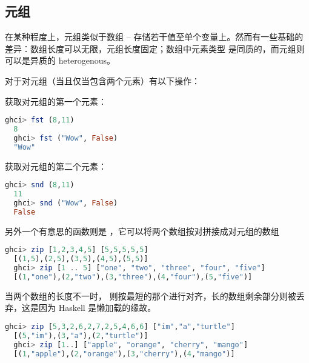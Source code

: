 \documentclass[./main.tex]{subfiles}
\begin{document}
\subsection*{元组}

在某种程度上，元组类似于数组 -- 存储若干值至单个变量上。然而有一些基础的差异：数组长度可以无限，元组长度固定；数组中元素类型
是同质的，而元组则可以是异质的 heterogenous。

对于对元组（当且仅当包含两个元素）有以下操作：

 获取对元组的第一个元素：

\begin{lstlisting}[language=Haskell]
  ghci> fst (8,11)
  8
  ghci> fst ("Wow", False)
  "Wow"
\end{lstlisting}

 获取对元组的第二个元素：

\begin{lstlisting}[language=Haskell]
  ghci> snd (8,11)
  11
  ghci> snd ("Wow", False)
  False
\end{lstlisting}

另外一个有意思的函数则是 ，它可以将两个数组按对拼接成对元组的数组

\begin{lstlisting}[language=Haskell]
  ghci> zip [1,2,3,4,5] [5,5,5,5,5]
  [(1,5),(2,5),(3,5),(4,5),(5,5)]
  ghci> zip [1 .. 5] ["one", "two", "three", "four", "five"]
  [(1,"one"),(2,"two"),(3,"three"),(4,"four"),(5,"five")]
\end{lstlisting}

当两个数组的长度不一时， 则按最短的那个进行对齐，长的数组剩余部分则被丢弃，这是因为 Haskell 是懒加载的缘故。

\begin{lstlisting}[language=Haskell]
  ghci> zip [5,3,2,6,2,7,2,5,4,6,6] ["im","a","turtle"]
  [(5,"im"),(3,"a"),(2,"turtle")]
  ghci> zip [1..] ["apple", "orange", "cherry", "mango"]
  [(1,"apple"),(2,"orange"),(3,"cherry"),(4,"mango")]
\end{lstlisting}
\end{document}
